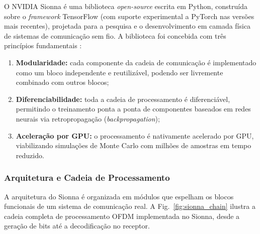 \documentclass[conference]{IEEEtran}
\begin{document}
O NVIDIA Sionna \cite{hoydis2022} é uma biblioteca \textit{open-source} escrita em Python, construída sobre o \textit{framework} TensorFlow (com suporte experimental a PyTorch nas versões mais recentes), projetada para a pesquisa e o desenvolvimento em camada física de sistemas de comunicação sem fio. A biblioteca foi concebida com três princípios fundamentais \cite{sionna_doc}:
\begin{enumerate}
    \item \textbf{Modularidade:} cada componente da cadeia de comunicação é implementado como um bloco independente e reutilizável, podendo ser livremente combinado com outros blocos;
    \item \textbf{Diferenciabilidade:} toda a cadeia de processamento é diferenciável, permitindo o treinamento ponta a ponta de componentes baseados em redes neurais via retropropagação (\textit{backpropagation});
    \item \textbf{Aceleração por GPU:} o processamento é nativamente acelerado por GPU, viabilizando simulações de Monte Carlo com milhões de amostras em tempo reduzido.
\end{enumerate}

\subsubsection{Arquitetura e Cadeia de Processamento}

A arquitetura do Sionna é organizada em módulos que espelham os blocos funcionais de um sistema de comunicação real. A Fig.~\ref{fig:sionna_chain} ilustra a cadeia completa de processamento OFDM implementada no Sionna, desde a geração de bits até a decodificação no receptor.
\end{document}
